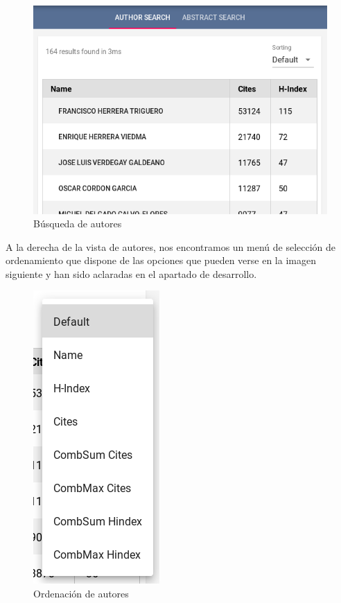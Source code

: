 \begin{figure}[h]
	
	\centering
	\includegraphics[width=\linewidth]{imagenes/UIAuthor}
	\caption{Búsqueda de autores}
\end{figure}



\newpage
A la derecha de la vista de autores, nos encontramos un menú de selección de ordenamiento que dispone de las opciones que pueden verse en la imagen siguiente y han sido aclaradas en el apartado de desarrollo.


\begin{figure}[h]

	\centering
	\includegraphics[width=0.20\linewidth]{imagenes/UIAuthorSelection}
	\caption{Ordenación de autores}

\end{figure}


